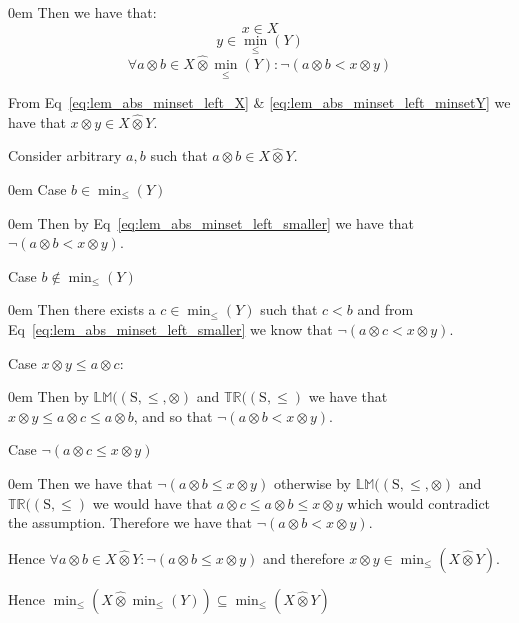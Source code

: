 \documentclass[10pt]{article}
\newcommand{\propname}[1]{{\mathbb{#1}}}
\newcommand{\lift}{\hat{\otimes}}
\newenvironment{ind}[0]{\begin{addmargin}[1em]{0em}\vspace{0.5em}}{\end{addmargin}\vspace{0.5em}}
\begin{document}
\begin{ind}
Then we have that:
\begin{equation} \label{eq:lem_abs_minset_left_X}
x \in X
\end{equation}
\begin{equation} \label{eq:lem_abs_minset_left_minsetY}
y \in \min_\leq(Y)
\end{equation}
\begin{equation} \label{eq:lem_abs_minset_left_smaller}
\forall a \otimes b \in X \lift \min_\leq(Y) : \neg (a \otimes b < x \otimes y)
\end{equation}

From Eq~\ref{eq:lem_abs_minset_left_X} \& \ref{eq:lem_abs_minset_left_minsetY} we have that $x \otimes y \in X \lift Y$.

\vspace{0.5em}

Consider arbitrary $a, b$ such that $a \otimes b \in X \lift Y$.
\begin{ind}
Case $b \in \min_\leq(Y)$
\begin{ind}
Then by Eq~\ref{eq:lem_abs_minset_left_smaller} we have that $\neg (a \otimes b < x \otimes y)$.
\end{ind}
Case $b \notin \min_\leq(Y)$
\begin{ind}
Then there exists a $c \in \min_\leq(Y)$ such that $c < b$ and from Eq~\ref{eq:lem_abs_minset_left_smaller} we know that $\neg (a \otimes c < x \otimes y)$.

\vspace{0.5em}

Case $x \otimes y \leq a \otimes c$:
\begin{ind}
Then by $\propname{LM}(\mathrm{(S,\leq,\otimes)}$ and $\propname{TR}(\mathrm{(S,\leq)}$ we have that $x \otimes y \leq a \otimes c \leq a \otimes b$, and so that $\neg (a \otimes b < x \otimes y)$.
\end{ind}
Case $\neg (a \otimes c \leq x \otimes y)$
\begin{ind}
Then we have that $\neg(a \otimes b \leq x \otimes y)$ otherwise by $\propname{LM}(\mathrm{(S,\leq,\otimes)}$ and $\propname{TR}(\mathrm{(S,\leq)}$ we would have that $a \otimes c \leq a \otimes b \leq x \otimes y$ which would contradict the assumption. Therefore we have that $\neg (a \otimes b < x \otimes y)$.
\end{ind}
\end{ind}
\end{ind}
Hence $\forall a \otimes b \in X \lift Y : \neg (a \otimes b \leq x \otimes y)$ and therefore $x \otimes y \in \min_\leq(X \lift Y)$.

\end{ind}
Hence $ \min_\leq(X \lift \min_\leq(Y)) \subseteq \min_\leq(X \lift Y)$
\end{document}
